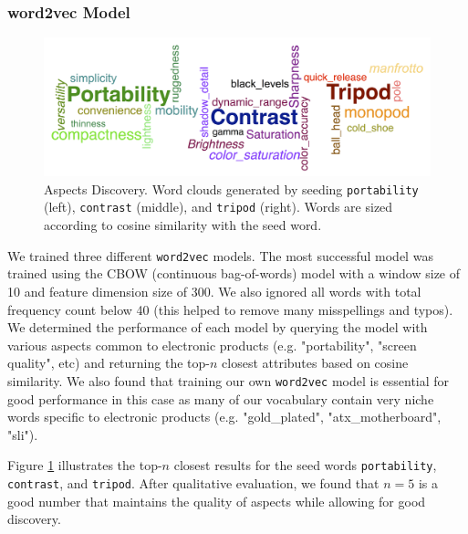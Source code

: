 \documentclass{article} %
\begin{document}
\subsubsection{word2vec Model}
\begin{figure}[ht]
\begin{center}
\includegraphics[width=\columnwidth]{Aspects_long.png}
\end{center}
\caption{Aspects Discovery. Word clouds generated by seeding \texttt{portability} (left), \texttt{contrast} (middle), and \texttt{tripod} (right). Words are sized according to cosine similarity with the seed word.}
\label{aspectFig}
\end{figure}

We trained three different \texttt{word2vec} models. The most successful model was trained using the CBOW (continuous bag-of-words) model with a window size of 10 and feature dimension size of 300. We also ignored all words with total frequency count below 40 (this helped to remove many misspellings and typos). We determined the performance of each model by querying the model with various aspects common to electronic products (e.g. "portability", "screen quality", etc) and returning the top-$n$ closest attributes based on cosine similarity. We also found that training our own \texttt{word2vec} model is essential for good performance in this case as many of our vocabulary contain very niche words specific to electronic products (e.g. "gold\_plated", "atx\_motherboard", "sli").

Figure \ref{aspectFig} illustrates the top-$n$ closest results for the seed words \texttt{portability}, \texttt{contrast}, and \texttt{tripod}. After qualitative evaluation, we found that $n=5$ is a good number that maintains the quality of aspects while allowing for good discovery.
\end{document}
